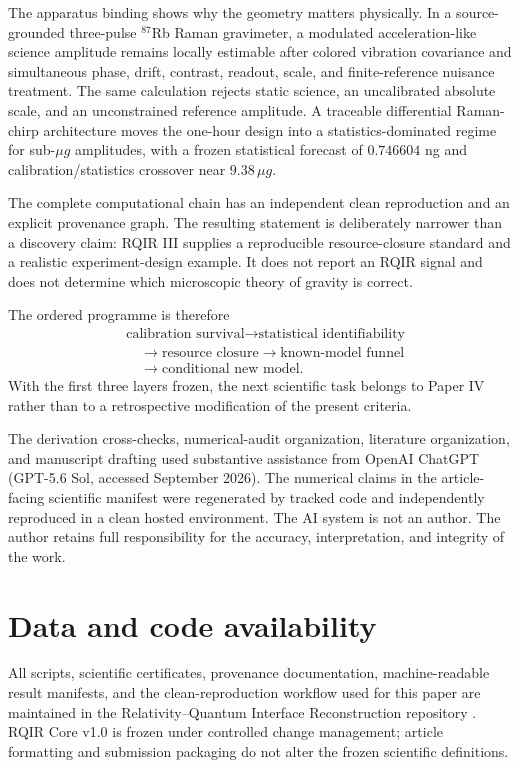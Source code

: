 The apparatus binding shows why the geometry matters physically. In a source-grounded three-pulse $^{87}$Rb Raman gravimeter, a modulated acceleration-like science amplitude remains locally estimable after colored vibration covariance and simultaneous phase, drift, contrast, readout, scale, and finite-reference nuisance treatment. The same calculation rejects static science, an uncalibrated absolute scale, and an unconstrained reference amplitude. A traceable differential Raman-chirp architecture moves the one-hour design into a statistics-dominated regime for sub-$\mu g$ amplitudes, with a frozen statistical forecast of $0.746604$ ng and calibration/statistics crossover near $9.38\,\mu g$.

The complete computational chain has an independent clean reproduction and an explicit provenance graph. The resulting statement is deliberately narrower than a discovery claim: RQIR III supplies a reproducible resource-closure standard and a realistic experiment-design example. It does not report an RQIR signal and does not determine which microscopic theory of gravity is correct.

The ordered programme is therefore
\begin{equation}
\begin{aligned}
&\text{calibration survival}\rightarrow\text{statistical identifiability}\\
&\quad\rightarrow\text{resource closure}\rightarrow\text{known-model funnel}\\
&\quad\rightarrow\text{conditional new model}.
\end{aligned}
\end{equation}
With the first three layers frozen, the next scientific task belongs to Paper IV rather than to a retrospective modification of the present criteria.

\begin{acknowledgments}
The derivation cross-checks, numerical-audit organization, literature organization, and manuscript drafting used substantive assistance from OpenAI ChatGPT (GPT-5.6 Sol, accessed September 2026). The numerical claims in the article-facing scientific manifest were regenerated by tracked code and independently reproduced in a clean hosted environment. The AI system is not an author. The author retains full responsibility for the accuracy, interpretation, and integrity of the work.
\end{acknowledgments}

\section*{Data and code availability}
All scripts, scientific certificates, provenance documentation, machine-readable result manifests, and the clean-reproduction workflow used for this paper are maintained in the Relativity--Quantum Interface Reconstruction repository \cite{RQIRRepo}. RQIR Core v1.0 is frozen under controlled change management; article formatting and submission packaging do not alter the frozen scientific definitions.

